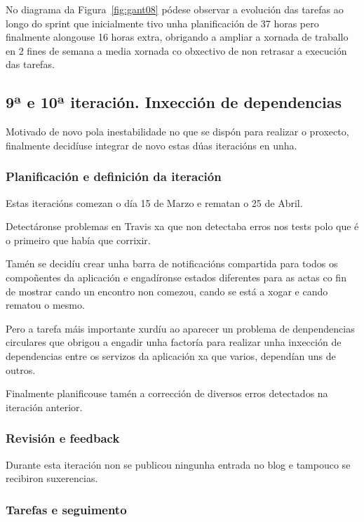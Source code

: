         No diagrama da Figura~\ref{fig:gant08} pódese observar a evolución das 
tarefas ao longo do sprint que inicialmente tivo unha planificación de 37 horas 
pero finalmente alongouse 16 horas extra, obrigando a ampliar a xornada de 
traballo en 2 fines de semana a media xornada co obxectivo de non retrasar a 
execución das tarefas.

    \subsection{9ª e 10ª iteración. Inxección de dependencias}
    Motivado de novo pola inestabilidade no que se dispón para realizar o 
proxecto, finalmente decidíuse integrar de novo estas dúas iteracións en unha.

      \subsubsection{Planificación e definición da iteración}
      Estas iteracións comezan o día 15 de Marzo e rematan o 25 de Abril.

      Detectáronse problemas en Travis xa que non detectaba erros nos tests 
polo que é o primeiro que había que corrixir.

      Tamén se decidíu crear unha barra de notificacións compartida para todos 
os compoñentes da aplicación e engadíronse estados diferentes para as actas co 
fin de mostrar cando un encontro non comezou, cando se está a xogar e cando 
rematou o mesmo.

      Pero a tarefa máis importante xurdíu ao aparecer un problema de 
denpendencias circulares que obrigou a engadir unha factoría para realizar unha 
inxección de dependencias entre os servizos da aplicación xa que varios, 
dependían uns de outros.

      Finalmente planificouse tamén a corrección de diversos erros detectados 
na iteración anterior.

      \subsubsection{Revisión e feedback}
      Durante esta iteración non se publicou ningunha entrada no blog e 
tampouco se recibiron suxerencias.

      \subsubsection{Tarefas e seguimento}

